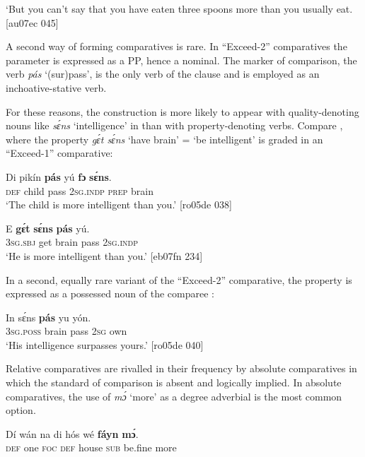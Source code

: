 \glt ‘But you can’t say that you have eaten three spoons more than you
usually eat. [au07ec 045]
\z

A second way of forming comparatives is rare. In “Exceed-2” comparatives \citep{Stassen1985} the parameter is expressed as a PP, hence a nominal. The marker of comparison, the verb \textit{pás} ‘(sur)pass’, is the only verb of the clause and is employed as an inchoative-stative verb. 


For these reasons, the construction is more likely to appear with quality-denoting nouns like \textit{sɛ́ns} ‘intelligence’ in  than with property-denoting verbs. Compare , where the property \textit{gɛ́t sɛ́ns} ‘have brain’ = ‘be intelligent’ is graded in an “Exceed-1” comparative:



\ea%
    \label{ex:key:483}
    \gll Di  pikín  \textbf{pás}    yú    \textbf{fɔ}  \textbf{sɛ́ns}.\\
\textsc{def}  child  pass    \textsc{2sg.indp}  \textsc{prep}  brain\\

\glt ‘The child is more intelligent than you.’ [ro05de 038]
\z


\ea%
    \label{ex:key:484}
    \gll E    \textbf{gɛ́t}  \textbf{sɛ́ns}    \textbf{pás}    yú.\\
\textsc{3sg.sbj}  get   brain  pass    \textsc{2sg.indp}\\

\glt ‘He is more intelligent than you.’ [eb07fn 234]
\z

In a second, equally rare variant of the “Exceed-2” comparative, the property is expressed as a possessed noun of the comparee : 


\ea%
    \label{ex:key:485}
    \gll In    sɛ́ns    \textbf{pás}  yu  yón.\\
\textsc{3sg.poss}  brain  pass  \textsc{2sg}  own\\

\glt ‘His intelligence surpasses yours.’ [ro05de 040]
\z

Relative comparatives are rivalled in their frequency by absolute comparatives in which the standard of comparison is absent and logically implied. In absolute comparatives, the use of \textit{mɔ́} ‘more’ as a degree adverbial  is the most common option. 


\ea%
    \label{ex:key:486}
    \gll Dí  wán    na  di    hós    wé  \textbf{fáyn}    \textbf{mɔ́}.\\
\textsc{def}  one    \textsc{foc}  \textsc{def}    house  \textsc{sub}  be.fine    more\\

